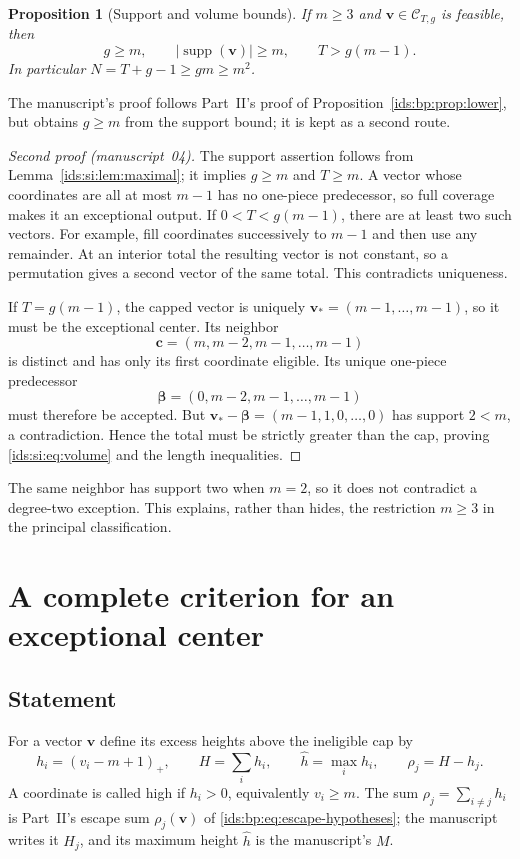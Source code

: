 \documentclass[11pt,letterpaper]{article}
\newtheorem{proposition}[theorem]{Proposition}
\theoremstyle{definition}\newtheorem{definition}[theorem]{Definition}
\theoremstyle{remark}\newtheorem{remark}[theorem]{Remark}
\theoremstyle{definition}\newtheorem{question}[theorem]{Question}
\DeclareMathOperator{\supp}{supp}
\newcommand{\bppos}[1]{(#1)_+}
\newcommand{\bpC}[2]{\mathcal C_{#1,#2}}
\begin{document}
\begin{proposition}[Support and volume bounds]\label{ids:si:prop:volume}
If $m\geq3$ and $\mathbf v\in\bpC{T}{g}$ is feasible, then
\begin{equation}\label{ids:si:eq:volume}
 g\geq m,\qquad |\supp(\mathbf v)|\geq m,\qquad T>g(m-1).
\end{equation}
In particular $N=T+g-1\geq gm\geq m^2$.
\end{proposition}
The manuscript's proof follows Part~II's proof of
Proposition~\ref{ids:bp:prop:lower}, but obtains $g\geq m$ from the support
bound; it is kept as a second route.
\begin{proof}[Second proof (manuscript~04)]
The support assertion follows from Lemma~\ref{ids:si:lem:maximal}; it implies $g\geq m$
and $T\geq m$. A vector whose coordinates are all at most $m-1$ has no
one-piece predecessor, so full coverage makes it an exceptional output.
If $0<T<g(m-1)$, there are at least two such vectors. For example, fill
coordinates successively to $m-1$ and then use any remainder. At an interior
total the resulting vector is not constant, so a permutation gives a
second vector of the same total. This contradicts uniqueness.

If $T=g(m-1)$, the capped vector is uniquely
$\mathbf v_*=(m-1,\ldots,m-1)$, so it must be the exceptional center. Its neighbor
\[
 \mathbf c=(m,m-2,m-1,\ldots,m-1)
\]
is distinct and has only its first coordinate eligible. Its unique
one-piece predecessor
\[
 \boldsymbol\beta=(0,m-2,m-1,\ldots,m-1)
\]
must therefore be accepted. But $\mathbf v_*-\boldsymbol\beta=(m-1,1,0,\ldots,0)$ has support
$2<m$, a contradiction. Hence the total must be strictly greater than the
cap, proving \eqref{ids:si:eq:volume} and the length inequalities.
\end{proof}

The same neighbor has support two when $m=2$, so it does not contradict a
degree-two exception. This explains, rather than hides, the restriction
$m\geq3$ in the principal classification.

\section{A complete criterion for an exceptional center}\label{ids:si:sec:classification}

\subsection{Statement}
For a vector $\mathbf v$ define its excess heights above the ineligible cap by
\begin{equation}\label{ids:si:eq:heights}
 h_i=\bppos{v_i-m+1},\qquad H=\sum_i h_i,\qquad \hat h=\max_i h_i,
 \qquad \rho_j=H-h_j.
\end{equation}
A coordinate is called high if $h_i>0$, equivalently $v_i\geq m$.
The sum $\rho_j=\sum_{i\ne j}h_i$ is Part~II's escape sum
$\rho_j(\mathbf v)$ of \eqref{ids:bp:eq:escape-hypotheses}; the manuscript
writes it $H_j$, and its maximum height $\hat h$ is the manuscript's $M$.
\end{document}
